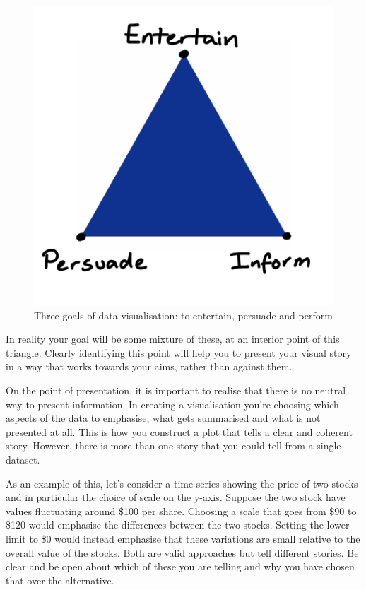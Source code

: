 \documentclass[
  letterpaper,
  DIV=11,
  numbers=noendperiod]{scrreprt}
\begin{document}
\begin{figure}[H]

{\centering \includegraphics{images/303-data-visualisation/entertain-persuade-inform.png}

}

\caption{Three goals of data visualisation: to entertain, persuade and
perform}

\end{figure}%

In reality your goal will be some mixture of these, at an interior point
of this triangle. Clearly identifying this point will help you to
present your visual story in a way that works towards your aims, rather
than against them.

On the point of presentation, it is important to realise that there is
no neutral way to present information. In creating a visualisation
you're choosing which aspects of the data to emphasise, what gets
summarised and what is not presented at all. This is how you construct a
plot that tells a clear and coherent story. However, there is more than
one story that you could tell from a single dataset.

As an example of this, let's consider a time-series showing the price of
two stocks and in particular the choice of scale on the y-axis. Suppose
the two stock have values fluctuating around \$100 per share. Choosing a
scale that goes from \$90 to \$120 would emphasise the differences
between the two stocks. Setting the lower limit to \$0 would instead
emphasise that these variations are small relative to the overall value
of the stocks. Both are valid approaches but tell different stories. Be
clear and be open about which of these you are telling and why you have
chosen that over the alternative.
\end{document}
